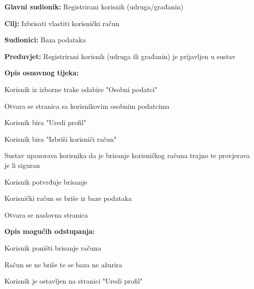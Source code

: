 		
				\noindent {}
			\begin{packed_item}
				
				\item \textbf{Glavni sudionik:} Registrirani korisnik (udruga/građanin)
				\item  \textbf{Cilj:} Izbrisati vlastiti korisnički račun
				\item  \textbf{Sudionici:} Baza podataka
				\item  \textbf{Preduvjet:} Registrirani korisnik (udruga ili građanin) je prijavljen u sustav
				\item  \textbf{Opis osnovnog tijeka:}
				
				\item[] \begin{packed_enum}	
					\item Korisnik iz izborne trake odabire "Osobni podatci"
					\item Otvara se stranica sa korisnikovim osobnim podatcima
					\item Korisnik bira "Uredi profil"
					\item Korisnik bira "Izbriši korisniči račun"
					\item Sustav upozorava korisnika da je brisanje korisničkog računa trajno te provjerava je li siguran
					\item Korisnik potvrđuje brisanje
					\item Korisnički račun se briše iz baze podataka
					\item Otvara se naslovna stranica
				\end{packed_enum}
				\item  \textbf{Opis mogućih odstupanja:}
				
				\item[] \begin{packed_item}
					
					\item [5.a]  Korisnik poništi brisanje računa
					\item[] \begin{packed_enum}
						\item Račun se ne briše te se baza ne ažurira
						\item Korisnik je ostavljen na stranici "Uredi profil"
					\end{packed_enum}
				\end{packed_item}
			\end{packed_item}
		
